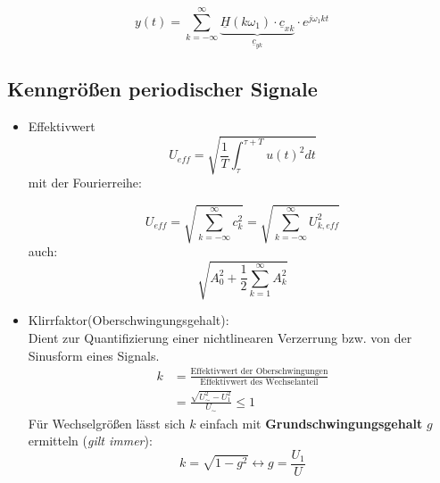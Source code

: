 \[
    y(t) = \sum_{k=-\infty}^{\infty} \underbrace{\underline{H}(k\omega_1)\cdot\underline{c}_{xk}}_{\underline{c}_{yk}} \cdot e^{j\omega_1 k t}
\]

\subsection{Kenngrößen periodischer Signale}
\begin{itemize}
    \item Effektivwert
        \[
            U_{\mathit{eff}} = \sqrt{\frac{1}{T} \int_\tau^{\tau+T} u(t)^2 dt}
        \]
        mit der Fourierreihe:

        $$ U_{\mathit{eff}} = \sqrt{\sum_{k=-\infty}^{\infty} c_k^2} = \sqrt{\sum_{k=-\infty}^{\infty}U_{k,\mathit{eff}}^2} $$
        auch:
        $$ \sqrt{A_0^2 + \frac{1}{2} \sum_{k=1}^{\infty} A_k^2} $$
    \item Klirrfaktor(Oberschwingungsgehalt):\\
        Dient zur Quantifizierung einer nichtlinearen Verzerrung bzw. von der
        Sinusform eines Signals.
        \begin{align*}
            k &= \frac{\text{Effektivwert der Oberschwingungen}}{\text{Effektivwert des Wechselanteil}} \\
                &= \frac{\sqrt{U_\sim^2 - U_1^2}}{U_\sim} \leq 1
        \end{align*}
        Für Wechselgrößen lässt sich $k$ einfach mit \textbf{Grundschwingungsgehalt} $g$ ermitteln (\textit{gilt immer}):
        \[
            k = \sqrt{1-g^2} \leftrightarrow g = \frac{U_1}{U}
        \]

\end{itemize}
